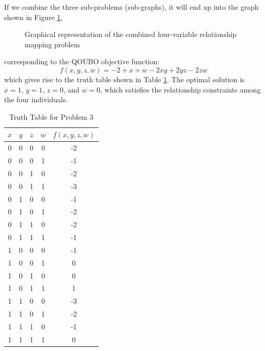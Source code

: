 If we combine the three sub-problems (sub-graphs), it will end up into the graph shown in Figure \ref{fig:qubo_graph_7}, 
\begin{figure}
    \centering
    \caption{Graphical representation of the combined four-variable relationship mapping problem}\label{fig:qubo_graph_7}
\end{figure}
corresponding to the QOUBO objective function:
\begin{equation}
f(x, y, z, w) = -2 +x +  w - 2xy + 2yz - 2zw
\end{equation}
which gives rise to the truth table shown in Table \ref{tab:truth_table_2}. The optimal solution is $x=1$, $y=1$, $z=0$, and $w=0$, which satisfies the relationship constraints among the four individuals.
\begin{table}[ht]
\centering
\caption{Truth Table for Problem 3}
\label{tab:truth_table_2}
\begin{tabular}{|c|c|c|c|c|}
\hline
$x$ & $y$ & $z$ & $w$ & $f(x, y, z, w)$ \\
\hline
0 & 0 & 0 & 0 & -2 \\
0 & 0 & 0 & 1 & -1 \\
0 & 0 & 1 & 0 & -2 \\
0 & 0 & 1 & 1 & -3 \\
0 & 1 & 0 & 0 & -1 \\
0 & 1 & 0 & 1 & -2 \\
0 & 1 & 1 & 0 & -2 \\
0 & 1 & 1 & 1 & -1 \\
1 & 0 & 0 & 0 & -1 \\
1 & 0 & 0 & 1 & 0 \\
1 & 0 & 1 & 0 & 0 \\
1 & 0 & 1 & 1 & 1 \\
1 & 1 & 0 & 0 & -3 \\
1 & 1 & 0 & 1 & -2 \\
1 & 1 & 1 & 0 & -1 \\
1 & 1 & 1 & 1 & 0 \\
\hline
\end{tabular}
\end{table}

